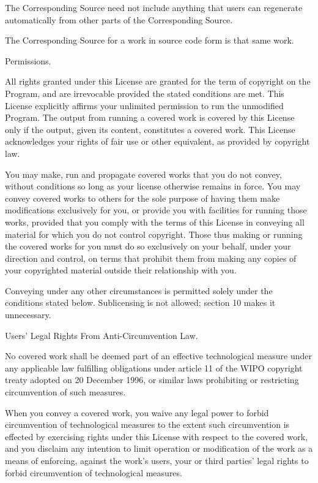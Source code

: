 The Corresponding Source need not include anything that users can
regenerate automatically from other parts of the Corresponding Source.

The Corresponding Source for a work in source code form is that same
work.

\itemBasic Permissions.

All rights granted under this License are granted for the term of
copyright on the Program, and are irrevocable provided the stated
conditions are met.  This License explicitly affirms your unlimited
permission to run the unmodified Program.  The output from running a
covered work is covered by this License only if the output, given its
content, constitutes a covered work.  This License acknowledges your
rights of fair use or other equivalent, as provided by copyright law.

You may make, run and propagate covered works that you do not convey,
without conditions so long as your license otherwise remains in force.
You may convey covered works to others for the sole purpose of having
them make modifications exclusively for you, or provide you with
facilities for running those works, provided that you comply with the
terms of this License in conveying all material for which you do not
control copyright.  Those thus making or running the covered works for
you must do so exclusively on your behalf, under your direction and
control, on terms that prohibit them from making any copies of your
copyrighted material outside their relationship with you.

Conveying under any other circumstances is permitted solely under the
conditions stated below.  Sublicensing is not allowed; section 10
makes it unnecessary.

\itemProtecting Users' Legal Rights From Anti-Circumvention Law.

No covered work shall be deemed part of an effective technological
measure under any applicable law fulfilling obligations under article
11 of the WIPO copyright treaty adopted on 20 December 1996, or
similar laws prohibiting or restricting circumvention of such
measures.

When you convey a covered work, you waive any legal power to forbid
circumvention of technological measures to the extent such
circumvention is effected by exercising rights under this License with
respect to the covered work, and you disclaim any intention to limit
operation or modification of the work as a means of enforcing, against
the work's users, your or third parties' legal rights to forbid
circumvention of technological measures.


